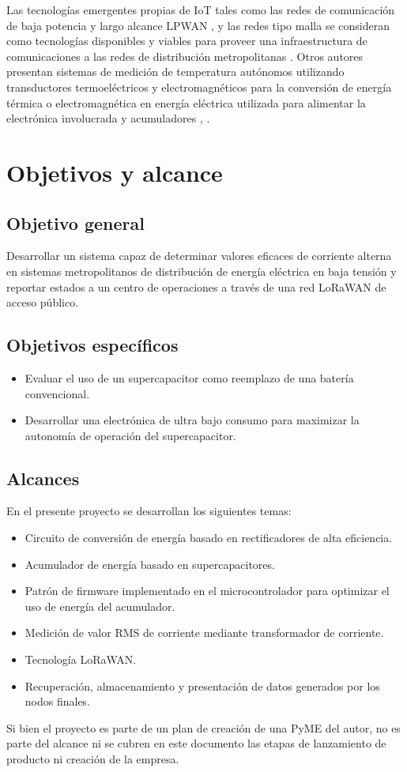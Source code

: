 Las tecnologías emergentes propias de IoT tales como las redes de comunicación de baja potencia y largo alcance LPWAN \citep{rfc8376}, y las redes tipo malla se consideran como tecnologías disponibles y viables para proveer una infraestructura de comunicaciones a las redes de distribución metropolitanas  \citep{ARTICLE:4}. Otros autores presentan sistemas de medición de temperatura autónomos utilizando transductores termoeléctricos y electromagnéticos para la conversión de energía térmica o electromagnética en energía eléctrica utilizada para alimentar la electrónica involucrada y acumuladores \citep{ARTICLE:5}, \citep{Hua}.


\section{Objetivos y alcance}
\subsection{Objetivo general}
Desarrollar un sistema capaz de determinar valores eficaces de corriente alterna en sistemas metropolitanos de distribución de energía eléctrica en baja tensión y reportar estados a un centro de operaciones a través de una red LoRaWAN de acceso público.\\
\subsection{Objetivos específicos}
\begin{itemize}
	\item Evaluar el uso de un supercapacitor como reemplazo de una batería convencional.\\
	\item Desarrollar una electrónica de ultra bajo consumo para maximizar la autonomía de operación del supercapacitor.
\end{itemize}
\subsection{Alcances}
En el presente proyecto se desarrollan los siguientes temas:
\begin{itemize}
	\item Circuito de conversión de energía  basado en rectificadores de alta eficiencia.
	\item Acumulador de energía basado en supercapacitores.
	\item Patrón de firmware implementado en el microcontrolador para optimizar el uso de energía del acumulador.
	\item Medición de valor RMS de corriente mediante transformador de corriente.
	\item Tecnología LoRaWAN.
	\item Recuperación, almacenamiento y presentación de datos generados por los nodos finales.
\end{itemize}
Si bien el proyecto es parte de un plan de creación de una PyME del autor, no es parte del alcance ni se cubren en este documento las etapas de lanzamiento de producto ni creación de la empresa.
